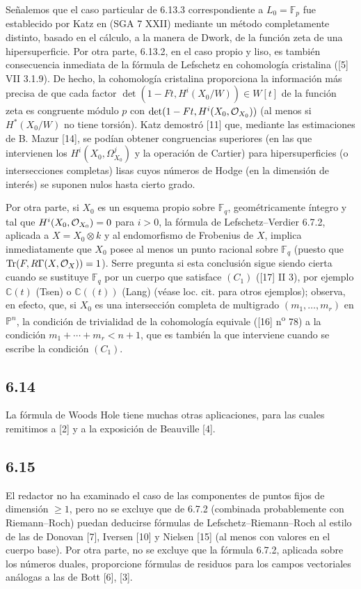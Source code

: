 Señalemos que el caso particular de 6.13.3 correspondiente a $L_0=\mathbb F_p$ fue establecido por Katz en (SGA 7 XXII) mediante un método completamente distinto, basado en el cálculo, a la manera de Dwork, de la función zeta de una hipersuperficie. Por otra parte, 6.13.2, en el caso propio y liso, es también consecuencia inmediata de la fórmula de Lefschetz en cohomología cristalina ([5] VII 3.1.9). De hecho, la cohomología cristalina proporciona la información más precisa de que cada factor $\det(1-Ft,H^i(X_0/W))\in W[t]$ de la función zeta es congruente módulo $p$ con $\det(1-Ft,H^i(X_0,\mathcal{O}_{X_0}))$ (al menos si $H^*(X_0/W)$ no tiene torsión). Katz demostró [11] que, mediante las estimaciones de B. Mazur [14], se podían obtener congruencias superiores (en las que intervienen los $H^i(X_0,\Omega^j_{X_0})$ y la operación de Cartier) para hipersuperficies (o intersecciones completas) lisas cuyos números de Hodge (en la dimensión de interés) se suponen nulos hasta cierto grado.

Por otra parte, si $X_0$ es un esquema propio sobre $\mathbb F_q$, geométricamente íntegro y tal que $H^i(X_0,\mathcal{O}_{X_0})=0$ para $i>0$, la fórmula de Lefschetz--Verdier 6.7.2, aplicada a $X=X_0\otimes k$ y al endomorfismo de Frobenius de $X$, implica inmediatamente que $X_0$ posee al menos un punto racional sobre $\mathbb F_q$ (puesto que $\operatorname{Tr}(F,R\Gamma(X,\mathcal{O}_X))=1$). Serre pregunta si esta conclusión sigue siendo cierta cuando se sustituye $\mathbb F_q$ por un cuerpo que satisface $(C_1)$ ([17] II 3), por ejemplo $\mathbb C(t)$ (Tsen) o $\mathbb C((t))$ (Lang) (véase loc. cit. para otros ejemplos); observa, en efecto, que, si $X_0$ es una intersección completa de multigrado $(m_1,\ldots,m_r)$ en $\mathbb P^n$, la condición de trivialidad de la cohomología equivale ([16] n\textsuperscript{o} 78) a la condición $m_1+\cdots+m_r<n+1$, que es también la que interviene cuando se escribe la condición $(C_1)$.

\subsection*{6.14}
La fórmula de Woods Hole tiene muchas otras aplicaciones, para las cuales remitimos a [2] y a la exposición de Beauville [4].


\subsection*{6.15}

El redactor no ha examinado el caso de las componentes de puntos fijos de dimensión $\geq1$, pero no se excluye que de 6.7.2 (combinada probablemente con Riemann--Roch) puedan deducirse fórmulas de Lefschetz--Riemann--Roch al estilo de las de Donovan [7], Iversen [10] y Nielsen [15] (al menos con valores en el cuerpo base). Por otra parte, no se excluye que la fórmula 6.7.2, aplicada sobre los números duales, proporcione fórmulas de residuos para los campos vectoriales análogas a las de Bott [6], [3].

